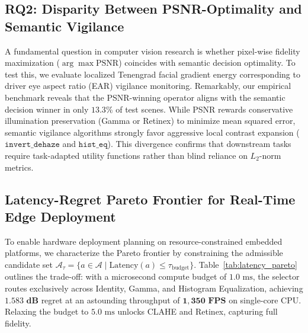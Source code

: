 \documentclass[journal]{IEEEtran}
\begin{document}
\subsection{RQ2: Disparity Between PSNR-Optimality and Semantic Vigilance}
A fundamental question in computer vision research is whether pixel-wise fidelity maximization ($\arg\max \text{PSNR}$) coincides with semantic decision optimality. To test this, we evaluate localized Tenengrad facial gradient energy corresponding to driver eye aspect ratio (EAR) vigilance monitoring.
Remarkably, our empirical benchmark reveals that the PSNR-winning operator aligns with the semantic decision winner in only $\mathbf{13.3\%}$ of test scenes. While PSNR rewards conservative illumination preservation (Gamma or Retinex) to minimize mean squared error, semantic vigilance algorithms strongly favor aggressive local contrast expansion ($\texttt{invert\_dehaze}$ and $\texttt{hist\_eq}$). This divergence confirms that downstream tasks require task-adapted utility functions rather than blind reliance on $L_2$-norm metrics.

\subsection{Latency-Regret Pareto Frontier for Real-Time Edge Deployment}
To enable hardware deployment planning on resource-constrained embedded platforms, we characterize the Pareto frontier by constraining the admissible candidate set $\mathcal{A}_{\tau} = \{a \in \mathcal{A} \mid \text{Latency}(a) \le \tau_{\text{budget}}\}$.
Table~\ref{tab:latency_pareto} outlines the trade-off: with a microsecond compute budget of $1.0\text{ ms}$, the selector routes exclusively across Identity, Gamma, and Histogram Equalization, achieving $\mathbf{1.583\text{ dB}}$ regret at an astounding throughput of $\mathbf{1,350\text{ FPS}}$ on single-core CPU. Relaxing the budget to $5.0\text{ ms}$ unlocks CLAHE and Retinex, capturing full fidelity.
\end{document}
